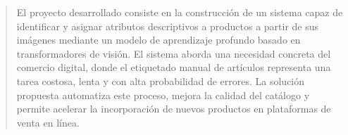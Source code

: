 \documentclass[
    11pt,
    spanish,
    singlespacing,
    parskip,
    headsepline,
    bookmarks=true,
    unicode=true,
    pdftoolbar=true,
    pdfmenubar=true,
    pdffitwindow=false,
    colorlinks=true,
    linkcolor=blue,
    citecolor=blue,
    urlcolor=blue
]{MastersDoctoralThesis}
\def\textbf#1{#1}%
\begin{document}



\frontmatter %
\pagestyle{plain} %


\begin{abstract}
\addchaptertocentry{\abstractname}
El proyecto desarrollado consiste en la construcción de un sistema capaz de identificar y asignar atributos descriptivos a productos a partir de sus imágenes mediante un modelo de aprendizaje profundo basado en transformadores de visión. El sistema aborda una necesidad concreta del comercio digital, donde el etiquetado manual de artículos representa una tarea costosa, lenta y con alta probabilidad de errores. La solución propuesta automatiza este proceso, mejora la calidad del catálogo y permite acelerar la incorporación de nuevos productos en plataformas de venta en línea.
\end{abstract}




\tableofcontents
\listoffigures
\listoftables


\end{document}
